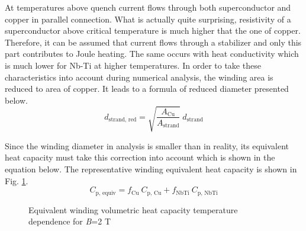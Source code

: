 \documentclass{article}
\begin{document}
At temperatures above quench current flows through both superconductor and copper in parallel connection. What is actually quite surprising, resistivity of a superconductor above critical temperature is much higher that the one of copper. Therefore, it can be assumed that current flows through a stabilizer and only this part contributes to Joule heating. The same occurs with heat conductivity which is much lower for Nb-Ti at higher temperatures. In order to take these characteristics into account during numerical analysis, the winding area is reduced to area of copper. It leads to a formula of reduced diameter presented below.
\begin{equation}
    d_\text{strand, red} = \sqrt{\frac{A_\text{Cu}}{A_\text{strand}}} ~ d_\text{strand}
\end{equation}

Since the winding diameter in analysis is smaller than in reality, its equivalent heat capacity must take this correction into account which is shown in the equation below. The representative winding equivalent heat capacity is shown in Fig. \ref{fig:eq_wind_cp}.
\begin{equation}
    C_\text{p, equiv} = f_\text{Cu} ~ C_\text{p, Cu} + f_\text{NbTi} ~ C_\text{p, NbTi}
\end{equation}
 
\begin{figure}[h!]
\centering
{}
\caption{Equivalent winding volumetric heat capacity temperature dependence for \textit{B}=2 T}
    \label{fig:eq_wind_cp}
\end{figure}
 
 
 
\end{document}
